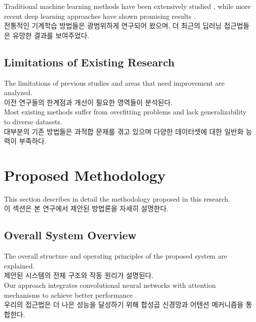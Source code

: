\documentclass[preprint,12pt]{elsarticle}
\begin{document}
Traditional machine learning methods have been extensively studied \cite{hastie2009elements}, while more recent deep learning approaches have shown promising results \cite{schmidhuber2015deep}. \\
전통적인 기계학습 방법들은 광범위하게 연구되어 왔으며, 더 최근의 딥러닝 접근법들은 유망한 결과를 보여주었다. \\

\subsection{Limitations of Existing Research}
The limitations of previous studies and areas that need improvement are analyzed. \\
이전 연구들의 한계점과 개선이 필요한 영역들이 분석된다. \\

Most existing methods suffer from overfitting problems and lack generalizability to diverse datasets. \\
대부분의 기존 방법들은 과적합 문제를 겪고 있으며 다양한 데이터셋에 대한 일반화 능력이 부족하다. \\

\section{Proposed Methodology}
\label{sec:methodology}

This section describes in detail the methodology proposed in this research. \\
이 섹션은 본 연구에서 제안된 방법론을 자세히 설명한다. \\

\subsection{Overall System Overview}
The overall structure and operating principles of the proposed system are explained. \\
제안된 시스템의 전체 구조와 작동 원리가 설명된다. \\

Our approach integrates convolutional neural networks with attention mechanisms to achieve better performance \cite{vaswani2017attention}. \\
우리의 접근법은 더 나은 성능을 달성하기 위해 합성곱 신경망과 어텐션 메커니즘을 통합한다. \\
\end{document}
